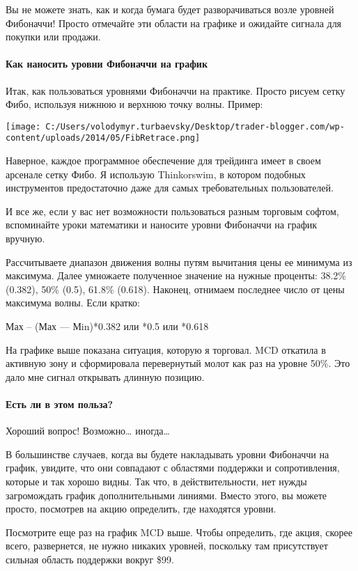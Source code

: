 \documentclass[a5paper]{article}
\begin{document}
Вы не можете знать, как и когда бумага будет разворачиваться возле уровней Фибоначчи! Просто отмечайте эти области на графике и ожидайте сигнала для покупки или продажи.

\paragraph{Как наносить уровни Фибоначчи на график}

Итак, как пользоваться уровнями Фибоначчи на практике. Просто рисуем
сетку Фибо, используя нижнюю и верхнюю точку волны. Пример:

\texttt{[image: C:/Users/volodymyr.turbaevsky/Desktop/trader-blogger.com/wp-content/uploads/2014/05/FibRetrace.png]}

Наверное, каждое программное обеспечение для трейдинга имеет в своем арсенале сетку Фибо. Я использую Thinkorswim, в котором подобных инструментов предостаточно даже для самых требовательных пользователей.

И все же, если у вас нет возможности пользоваться разным торговым софтом, вспоминайте уроки математики и наносите уровни Фибоначчи на график вручную.

Рассчитываете диапазон движения волны путям вычитания цены ее минимума из максимума. Далее умножаете полученное значение на нужные проценты: 38.2\% (0.382), 50\% (0.5), 61.8\% (0.618). Наконец, отнимаем последнее число от цены максимума волны. Если кратко:

Мах – (Мах — Мin)*0.382 или *0.5 или *0.618

На графике выше показана ситуация, которую я торговал. MCD откатила в активную зону и сформировала перевернутый молот как раз на уровне 50\%. Это дало мне сигнал открывать длинную позицию.

\paragraph{Есть ли в этом польза?}

Хороший вопрос! Возможно… иногда…

В большинстве случаев, когда вы будете накладывать уровни Фибоначчи на график, увидите, что они совпадают с областями поддержки и сопротивления, которые и так хорошо видны. Так что, в действительности, нет нужды загромождать график дополнительными линиями. Вместо этого, вы можете просто, посмотрев на акцию определить, где находятся уровни.

Посмотрите еще раз на график MCD выше. Чтобы определить, где акция, скорее всего, развернется, не нужно никаких уровней, поскольку там присутствует сильная область поддержки вокруг \$99.
\end{document}
